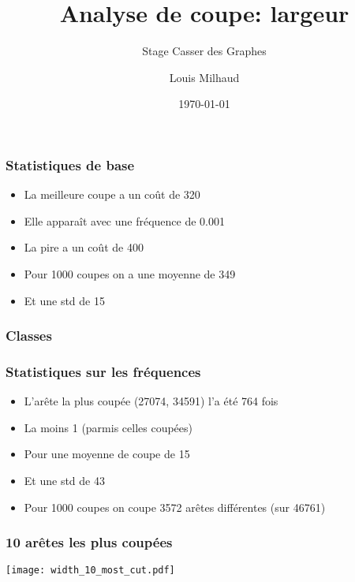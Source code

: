 \documentclass[aspectratio=169]{beamer}
\title{Analyse de coupe: largeur}
\subtitle{Stage Casser des Graphes}
\author{Louis Milhaud}
\institute{Complex Networks - LIP6}
\date{\today}
\begin{document}
    \begin{frame}
        \titlepage
    \end{frame}

    \begin{frame}
        \frametitle{Statistiques de base}

        \begin{itemize}
            \item La meilleure coupe a un coût de 320
            \item Elle apparaît avec une fréquence de 0.001
            \item La pire a un coût de 400
            \item Pour 1000 coupes on a une moyenne de 349
            \item Et une std de 15
        \end{itemize}
    
    \end{frame}

    \begin{frame}
        \frametitle{Classes}
    \end{frame}

    \begin{frame}
        \frametitle{Statistiques sur les fréquences}
        
        \begin{itemize}
            \item L'arête la plus coupée (27074, 34591) l'a été 764 fois
            \item La moins 1 (parmis celles coupées)
            \item Pour une moyenne de coupe de 15
            \item Et une std de 43
            \item Pour 1000 coupes on coupe 3572 arêtes différentes (sur 46761)
        \end{itemize}
    
    \end{frame}

    \begin{frame}
        \frametitle{10 arêtes les plus coupées}
        \centering
        \texttt{[image: width\_10\_most\_cut.pdf]}
    \end{frame}
\end{document}
